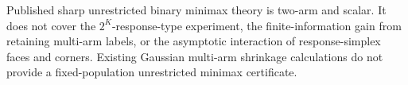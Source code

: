 Published sharp unrestricted binary minimax theory is two-arm and scalar.  It does not cover the \(2^K\)-response-type experiment, the finite-information gain from retaining multi-arm labels, or the asymptotic interaction of response-simplex faces and corners.  Existing Gaussian multi-arm shrinkage calculations do not provide a fixed-population unrestricted minimax certificate.